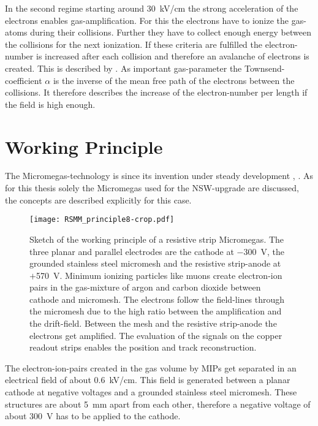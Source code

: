 \documentclass[
twoside,            %
BCOR1.4cm,          %
10pt,               %
headings=normal,    %
headsepline,        %
clearplainpage,		%
final,              %
div=14,
open=right,
bibliography=toc
]{scrreprt}
\begin{document}
In the second regime starting around \SI{30}{kV/cm} the strong acceleration of the electrons enables gas-amplification.
For this the electrons have to ionize the gas-atoms during their collisions.
Further they have to collect enough energy between the collisions for the next ionization.
If these criteria are fulfilled the electron-number is increased after each collision and therefore an avalanche of electrons is created.
This is described by \cite{townsendIonization}.
As important gas-parameter the Townsend-coefficient $\alpha$ is the inverse of the mean free path of the electrons between the collisions.
It therefore describes the increase of the electron-number per length if the field is high enough. 

\section{Working Principle}

The Micromegas-technology is since its invention under steady development \cite{bortfeldtThesis}, \cite{klitznerThesis}.
As for this thesis solely the Micromegas used for the NSW-upgrade are discussed, the concepts are described explicitly for this case.

\begin{figure}[!h]
	\centering
	\texttt{[image: RSMM\_principle8-crop.pdf]}
	\label{MMprinciple} 
	\vspace{-2mm}
	\caption{
		Sketch of the working principle of a resistive strip Micromegas.
		The three planar and parallel electrodes are the cathode at \SI{-300}{V}, the grounded stainless steel micromesh and the resistive strip-anode at $+$\SI{570}{V}.
		Minimum ionizing particles like muons create electron-ion pairs in the gas-mixture of argon and carbon dioxide between cathode and micromesh.
		The electrons follow the field-lines through the micromesh due to the high ratio between the amplification and the drift-field.
		Between the mesh and the resistive strip-anode the electrons get amplified.
		The evaluation of the signals on the copper readout strips enables the position and track reconstruction.
	}
\end{figure}

The electron-ion-pairs created in the gas volume by MIPs get separated in an electrical field of about \SI{0.6}{kV/cm}.
This field is generated between a planar cathode at negative voltages and a grounded stainless steel micromesh.
These structures are about \SI{5}{mm} apart from each other, therefore a negative voltage of about \SI{300}{V} has to be applied to the cathode.
\end{document}
